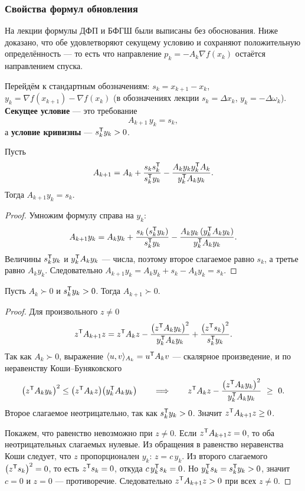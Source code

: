 \subsubsection*{Свойства формул обновления}

\begin{idea}[title={Откуда этот материал}]
На лекции формулы ДФП и БФГШ были выписаны без обоснования. Ниже доказано, что
обе удовлетворяют секущему условию и сохраняют положительную определённость —
то есть что направление $p_k = -A_k \nabla f(x_k)$ остаётся направлением
спуска.
\end{idea}

Перейдём к стандартным обозначениям: $s_k = x_{k+1} - x_k$,
$y_k = \nabla f(x_{k+1}) - \nabla f(x_k)$ (в обозначениях лекции
$s_k = \Delta x_k$, $y_k = -\Delta\omega_k$). \textbf{Секущее
условие} — это требование
\[
  A_{k+1}\, y_k = s_k ,
\]
а \textbf{условие кривизны} — $s_k^{\mathsf{T}} y_k > 0$.

\begin{theorem}\label{thm:dfp-secant}
Пусть
\[
  A_{k+1} = A_k + \frac{s_k s_k^{\mathsf{T}}}{s_k^{\mathsf{T}} y_k}
            - \frac{A_k y_k y_k^{\mathsf{T}} A_k}{y_k^{\mathsf{T}} A_k y_k} .
\]
Тогда $A_{k+1} y_k = s_k$.
\end{theorem}

\begin{proof}
Умножим формулу справа на $y_k$:
\[
  A_{k+1} y_k = A_k y_k + \frac{s_k \,(s_k^{\mathsf{T}} y_k)}{s_k^{\mathsf{T}} y_k}
    - \frac{A_k y_k\,(y_k^{\mathsf{T}} A_k y_k)}{y_k^{\mathsf{T}} A_k y_k} .
\]
Величины $s_k^{\mathsf{T}} y_k$ и $y_k^{\mathsf{T}} A_k y_k$ — числа, поэтому второе слагаемое равно
$s_k$, а третье равно $A_k y_k$. Следовательно
$A_{k+1} y_k = A_k y_k + s_k - A_k y_k = s_k$.
\end{proof}

\begin{theorem}\label{thm:dfp-pd}
Пусть $A_k \succ 0$ и $s_k^{\mathsf{T}} y_k > 0$. Тогда $A_{k+1} \succ 0$.
\end{theorem}

\begin{proof}
Для произвольного $z \ne 0$
\[
  z^{\mathsf{T}} A_{k+1} z = z^{\mathsf{T}} A_k z
    - \frac{\big(z^{\mathsf{T}} A_k y_k\big)^2}{y_k^{\mathsf{T}} A_k y_k}
    + \frac{\big(z^{\mathsf{T}} s_k\big)^2}{s_k^{\mathsf{T}} y_k} .
\]
Так как $A_k \succ 0$, выражение
$\langle u, v\rangle_{A_k} = u^{\mathsf{T}} A_k v$ — скалярное произведение, и по
неравенству Коши--Буняковского
\[
  \big(z^{\mathsf{T}} A_k y_k\big)^2 \le \big(z^{\mathsf{T}} A_k z\big)\big(y_k^{\mathsf{T}} A_k y_k\big)
  \qquad\Longrightarrow\qquad
  z^{\mathsf{T}} A_k z - \frac{\big(z^{\mathsf{T}} A_k y_k\big)^2}{y_k^{\mathsf{T}} A_k y_k} \ \ge\ 0 .
\]
Второе слагаемое неотрицательно, так как $s_k^{\mathsf{T}} y_k > 0$. Значит
$z^{\mathsf{T}} A_{k+1} z \ge 0$.

Покажем, что равенство невозможно при $z \ne 0$. Если $z^{\mathsf{T}} A_{k+1}z = 0$, то
оба неотрицательных слагаемых нулевые. Из обращения в равенство неравенства
Коши следует, что $z$ пропорционален $y_k$: $z = c\,y_k$. Из второго
слагаемого $\big(z^{\mathsf{T}} s_k\big)^2 = 0$, то есть $z^{\mathsf{T}} s_k = 0$, откуда
$c\,y_k^{\mathsf{T}} s_k = 0$. Но $y_k^{\mathsf{T}} s_k = s_k^{\mathsf{T}} y_k > 0$, значит $c = 0$ и $z = 0$ —
противоречие. Следовательно $z^{\mathsf{T}} A_{k+1} z > 0$ при всех $z \ne 0$.
\end{proof}

